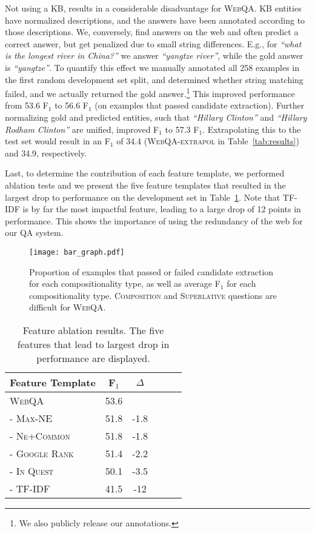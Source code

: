 \documentclass[11pt,a4paper]{article}
\newcommand\nl[1]{{\it``#1''}}
\begin{document}
Not using a KB, results in a considerable disadvantage for \textsc{WebQA}.
KB entities have normalized descriptions, and the answers have been annotated according to those descriptions.
We, conversely, find answers on the web and often predict a correct answer, but get penalized due to small string differences. 
E.g., for \nl{what is the longest river in China?} we answer \nl{yangtze river}, while the gold answer is \nl{yangtze}.
To quantify this effect we manually annotated all 258 examples in the first random development set split, and determined whether string matching failed, and we actually returned the gold answer.\footnote{We also publicly release our annotations.} 
This improved performance from 53.6 F$_1$  to 56.6 F$_1$ (on examples that passed candidate extraction). Further normalizing gold and predicted entities, such that \nl{Hillary Clinton} and \nl{Hillary Rodham Clinton} are unified, improved F$_1$ to 57.3 F$_1$. Extrapolating this to the test set would result in an F$_1$ of 34.4 (\textsc{WebQA-extrapol} in Table~\ref{tab:results}) and 34.9, respectively.

Last, to determine the contribution of each feature template, we performed ablation tests and we present the five feature templates that resulted in the largest drop to performance on the development set in Table~\ref{tab:ablation}. 
Note that TF-IDF is by far the most impactful feature, leading to a large drop of 12 points in performance. This shows the importance of using the redundancy of the web for our QA system.

\begin{figure}
\centering
\texttt{[image: bar\_graph.pdf]}
\caption{Proportion of examples that passed or failed candidate extraction for each compositionality type, as well as average F$_1$ for each compositionality type. \textsc{Composition} and \textsc{Superlative} questions are difficult for \textsc{WebQA}.}
\label{fig:compositionality}
\end{figure}
\begin{table}[t]
\begin{center}
\scriptsize{
\begin{tabular}{l|c|c|c|c|c|}
 \toprule 
 \textbf{Feature Template} & \textbf{F$_1$} & \textbf{$\Delta$} \\ 
 \midrule
\textsc{WebQA} & 53.6 & \\  
\hline
\textsc{- Max-NE} & 51.8 & -1.8 \\
\textsc{- Ne+Common} & 51.8 & -1.8 \\
\textsc{- Google Rank} & 51.4 & -2.2 \\
\textsc{- In Quest} & 50.1 & -3.5\\ 
\textsc{- TF-IDF} & 41.5 & -12\\ 
\toprule
\end{tabular}}
\end{center}
\caption{Feature ablation results. The five features that lead to largest drop in performance are displayed.}
\label{tab:ablation}
\end{table}
\end{document}
